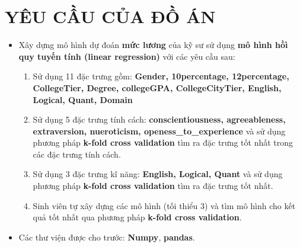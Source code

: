 \documentclass{report}
\begin{document}
\section{YÊU CẦU CỦA ĐỒ ÁN}
\begin{itemize} \label{sec:requirement}
    \item Xây dựng mô hình dự đoán \textbf{mức lương} của kỹ sư sử dụng \textbf{mô hình hồì quy tuyến tính (linear regression)} với các yêu cầu sau:
    \begin{enumerate}
        \item Sử dụng 11 đặc trưng gồm: \textbf{Gender, 10percentage, 12percentage, CollegeTier, Degree, collegeGPA, CollegeCityTier, English, Logical, Quant, Domain}
    
        \item Sử dụng 5 đặc trưng tính cách: \textbf{conscientiousness, agreeableness, extraversion, nueroticism, openess\_to\_experience} và sử dụng phương pháp \textbf{k-fold cross validation} tìm ra đặc trưng tốt nhất trong các đặc trưng tính cách.
        
        \item Sử dụng 3 đặc trưng kĩ năng: \textbf{English, Logical, Quant} và sử dụng phương pháp \textbf{k-fold cross validation} tìm ra đặc trưng tốt nhất.
 
        \item Sinh viên tự xây dựng các mô hình (tối thiểu 3) và tìm mô hình cho kết quả tốt nhất qua phương pháp \textbf{k-fold cross validation}.
    \end{enumerate}

    \item Các thư viện được cho trước: \textbf{Numpy}, \textbf{pandas}.
\end{itemize}
\end{document}
